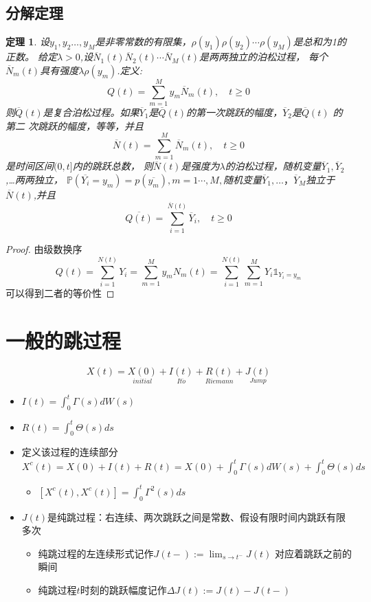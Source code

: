 \documentclass[a4paper, 12pt]{ctexart}
\newtheorem*{theorem}{定理}
\begin{document}
\subsection{分解定理}
\begin{theorem}
    设$y_{1},y_{2} \dots,y_{M}$是非零常数的有限集，$\rho(y_{1}) \rho(y_{2}) \cdots \rho(y_{M})$是总和为1的正数。
给定$\lambda>0$,设$\overline{N}_{1}(t) \overline{N}_{2}(t) \cdots\overline{N}_{M}(t)$是两两独立的泊松过程，
每个$\overline{N}_{m}(t)$具有强度$\lambda\rho(y_{m})$.定义:
$$Q(t) = \sum_{m=1}^{M} y_{m}\overline{N}_{m}(t),\quad t\geqslant0$$
则$\overline{Q}(t)$是复合泊松过程。如果$\overline{Y}_{1}$是$\overline{Q}(t)$的第一次跳跃的幅度，$\overline{Y}_{2}$是$\overline{Q}(t)$
的第二 次跳跃的幅度，等等，并且
$$\overline{N}(t)=\sum_{m=1}^{M}\overline{N}_{m}(t),\quad t\geqslant0$$
是时间区间$(0,t]$内的跳跃总数，
则$\overline{N}(t)$是强度为$\lambda$的泊松过程，随机变量$\overline{Y}_{1},\overline{Y}_{2}$,…两两独立，
$\mathbb{P}({\overline{Y_i} = y_m})=p (\overline{y_{m}}),m=1\cdots,M,$随机变量$\overline{Y}_{1},…，\overline{Y}_{M}$独立于$\overline{N}(t)$,并且
$$\overline{Q(t)}= \sum_{i=1} ^{\overline{N}(t)}\overline{Y}_{i},\quad t\geqslant0$$
\end{theorem}

\begin{proof}
    由级数换序
    $$Q(t)=\sum_{i=1}^{N(t)}Y_{i}=\sum_{m=1}^M y_{m}N_{m}(t)=\sum_{i=1}^{N(t)} \sum_{m=1}^M Y_{i}\mathbb{1}_{Y_{i}=y_m}$$
    可以得到二者的等价性
\end{proof}

\section{一般的跳过程}
$$X(t)=\underset{initial}{X(0)}+\underset{ It\ddot{o} }{ I(t) }+\underset{ Riemann }{ R(t) }+\underset{ Jump }{ J(t) }$$


\begin{itemize}
    \item $I(t) = \int_0^t \Gamma(s)dW(s)$
    \item $R(t) = \int_0^t \Theta(s)ds$
    \item 定义该过程的连续部分$X^c(t)=X(0)+I(t)+R(t)=X(0)+\int_0^t \Gamma(s)dW(s)+ \int_0^t \Theta(s)ds$
    \begin{itemize}
        \item $[X^c(t),X^c(t)]=\int_0^t \Gamma^{2}(s)ds$
    \end{itemize}
    \item $J(t)$是纯跳过程：右连续、两次跳跃之间是常数、假设有限时间内跳跃有限多次
    \begin{itemize}
        \item 纯跳过程的左连续形式记作$J(t-):=\lim_{ s \to t^- }J(t)$  对应着跳跃之前的瞬间
        \item 纯跳过程$t$时刻的跳跃幅度记作$\Delta J(t):=J(t)-J(t-)$
    \end{itemize}
\end{itemize}
\end{document}
